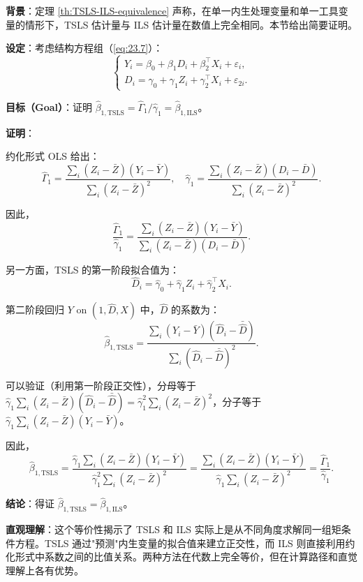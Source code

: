 \textbf{背景}：定理 \cref{th:TSLS-ILS-equivalence} 声称，在单一内生处理变量和单一工具变量的情形下，TSLS 估计量与 ILS 估计量在数值上完全相同。本节给出简要证明。

\textbf{设定}：考虑结构方程组（\cref{eq:23.7}）：
\[
\begin{cases}
Y_i = \beta_0 + \beta_1 D_i + \beta_2^{\top}X_i + \varepsilon_i, \\
D_i = \gamma_0 + \gamma_1 Z_i + \gamma_2^{\top}X_i + \varepsilon_{2i}.
\end{cases}
\]

\textbf{目标（Goal）}：证明 $\hat{\beta}_{1,\mathrm{TSLS}} = \hat{\Gamma}_1 / \hat{\gamma}_1 = \hat{\beta}_{1,\mathrm{ILS}}$。

\textbf{证明}：

约化形式 OLS 给出：
\[
\hat{\Gamma}_1 = \frac{\sum_{i}(Z_i - \bar{Z})(Y_i - \bar{Y})}{\sum_{i}(Z_i - \bar{Z})^2}, \quad
\hat{\gamma}_1 = \frac{\sum_{i}(Z_i - \bar{Z})(D_i - \bar{D})}{\sum_{i}(Z_i - \bar{Z})^2}.
\]

因此，
\[
\frac{\hat{\Gamma}_1}{\hat{\gamma}_1} = \frac{\sum_{i}(Z_i - \bar{Z})(Y_i - \bar{Y})}{\sum_{i}(Z_i - \bar{Z})(D_i - \bar{D})}. \label{eq:A.8}
\]

另一方面，TSLS 的第一阶段拟合值为：
\[
\hat{D}_i = \hat{\gamma}_0 + \hat{\gamma}_1 Z_i + \hat{\gamma}_2^{\top}X_i.
\]

第二阶段回归 $Y$ on $(1, \hat{D}, X)$ 中，$\hat{D}$ 的系数为：
\[
\hat{\beta}_{1,\mathrm{TSLS}} = \frac{\sum_{i}(Y_i - \bar{Y})(\hat{D}_i - \bar{\hat{D}})}{\sum_{i}(\hat{D}_i - \bar{\hat{D}})^2}.
\]

可以验证（利用第一阶段正交性），分母等于 $\hat{\gamma}_1 \sum_{i}(Z_i - \bar{Z})(\hat{D}_i - \bar{\hat{D}}) = \hat{\gamma}_1^2 \sum_{i}(Z_i - \bar{Z})^2$，分子等于 $\hat{\gamma}_1 \sum_{i}(Z_i - \bar{Z})(Y_i - \bar{Y})$。

因此，
\[
\hat{\beta}_{1,\mathrm{TSLS}} = \frac{\hat{\gamma}_1 \sum_{i}(Z_i - \bar{Z})(Y_i - \bar{Y})}{\hat{\gamma}_1^2 \sum_{i}(Z_i - \bar{Z})^2} = \frac{\sum_{i}(Z_i - \bar{Z})(Y_i - \bar{Y})}{\hat{\gamma}_1 \sum_{i}(Z_i - \bar{Z})^2} = \frac{\hat{\Gamma}_1}{\hat{\gamma}_1}.
\]

\textbf{结论}：得证 $\hat{\beta}_{1,\mathrm{TSLS}} = \hat{\beta}_{1,\mathrm{ILS}}$。

\textbf{直观理解}：这个等价性揭示了 TSLS 和 ILS 实际上是从不同角度求解同一组矩条件方程。TSLS 通过"预测"内生变量的拟合值来建立正交性，而 ILS 则直接利用约化形式中系数之间的比值关系。两种方法在代数上完全等价，但在计算路径和直觉理解上各有优势。

